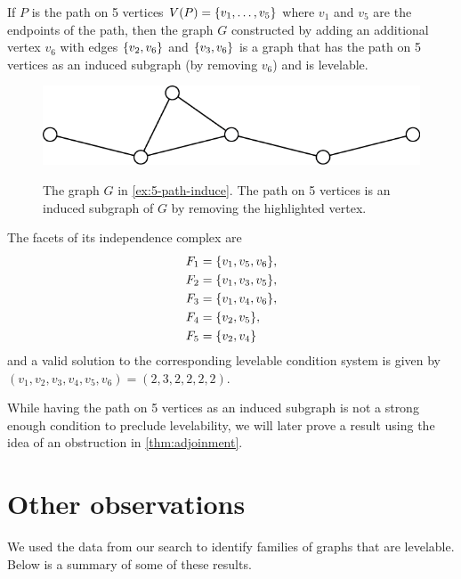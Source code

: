 \begin{example} \label{ex:5-path-induce} If $P$ is the path on 5 vertices $V(P) = \{ v_1, \dots, v_5 \}$ where $v_1$ and $v_5$ are the endpoints of the path, then the graph $G$ constructed by adding an additional vertex $v_6$ with edges $\{ v_2, v_6 \}$ and $\{ v_3, v_6 \}$ is a graph that has the path on 5 vertices as an induced subgraph (by removing $v_6$) and is levelable. 
\begin{figure}[bth]
    \myfloatalign
    \vspace{0.3cm}
    {\includegraphics[width=.55\linewidth]{figures/5-path-induce.png}} 
    \vspace{0.2cm}
    \caption{The graph $G$ in \autoref{ex:5-path-induce}. The path on 5 vertices is an induced subgraph of $G$ by removing the highlighted vertex.}
\end{figure}
The facets of its independence complex are
\begin{equation*}
\begin{aligned}
&F_1 = \{ v_1, v_5, v_6 \}, \\
&F_2 = \{ v_1, v_3, v_5 \}, \\
&F_3 = \{ v_1, v_4, v_6 \}, \\
&F_4 = \{ v_2, v_5 \}, \\
&F_5 = \{ v_2, v_4 \}
\end{aligned}
\end{equation*}
and a valid solution to the corresponding levelable condition system is given by
$(v_1, v_2, v_3, v_4, v_5, v_6)= (2, 3, 2, 2, 2, 2)$.
\end{example}

While having the path on 5 vertices as an induced subgraph is not a strong enough condition to preclude levelability, we will later prove a result using the idea of an obstruction in \autoref{thm:adjoinment}.


\section{Other observations} 
We used the data from our search to identify families of graphs that are levelable. Below is a summary of some of these results.

